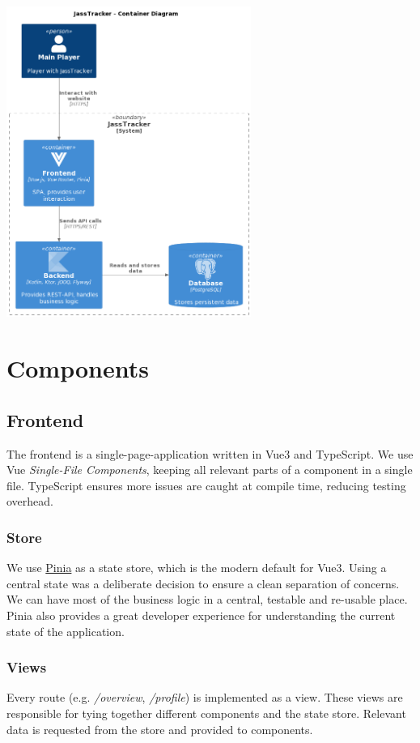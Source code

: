\includegraphics[width=0.6\textwidth]{resources/diagrams/c4-2-container}

\section{Components}

\subsection{Frontend}
The frontend is a single-page-application written in Vue3 and TypeScript.
We use Vue \emph{Single-File Components}, keeping all relevant parts of a component in a single file.
TypeScript ensures more issues are caught at compile time, reducing testing overhead.

\subsubsection*{Store}
We use \href{https://pinia.vuejs.org/}{Pinia} as a state store, which is the modern default for Vue3.
Using a central state was a deliberate decision to ensure a clean separation of concerns.
We can have most of the business logic in a central, testable and re-usable place.
Pinia also provides a great developer experience for understanding the current state of the application.

\subsubsection*{Views}
Every route (e.g. \emph{/overview}, \emph{/profile}) is implemented as a view.
These views are responsible for tying together different components and the state store.
Relevant data is requested from the store and provided to components.

